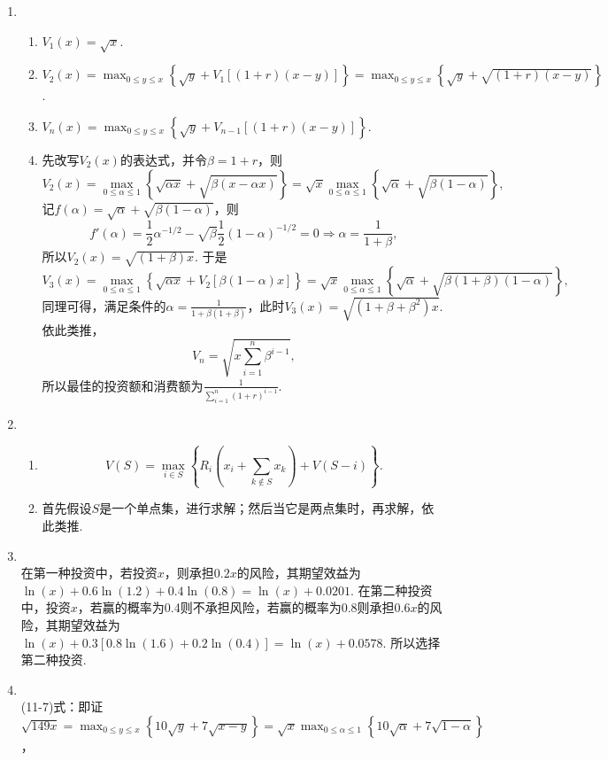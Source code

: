 \begin{enumerate}[label=\arabic{section}.\arabic*]
    \item \sol
    \begin{enumerate}[label=\alph*)]
        \item $V_1(x)=\sqrt{x}$.
        \item $\displaystyle V_2(x)=\max_{0 \leq y \leq x}\left\{\sqrt{y}+V_1[(1+r)(x-y)]\right\}=\max_{0 \leq y \leq x}\left\{\sqrt{y}+\sqrt{(1+r)(x-y)}\right\}$.
        \item $\displaystyle V_n(x)=\max_{0 \leq y \leq x}\left\{\sqrt{y}+V_{n-1}[(1+r)(x-y)]\right\}$.
        \item 先改写$V_2(x)$的表达式，并令$\beta = 1+r$，则
        \[V_2(x)=\max_{0 \leq \alpha \leq 1} \left\{\sqrt{\alpha x}+\sqrt{\beta(x-\alpha x)}\right\}=\sqrt{x} \max_{0 \leq \alpha \leq 1} \left\{\sqrt{\alpha}+\sqrt{\beta(1-\alpha)}\right\},\]
        记$\displaystyle f(\alpha)=\sqrt{\alpha}+\sqrt{\beta(1-\alpha)}$，则
        \[f'(\alpha)=\frac{1}{2}\alpha^{-1/2}-\sqrt{\beta}\frac{1}{2}(1-\alpha)^{-1/2}=0 \Rightarrow \alpha=\frac{1}{1+\beta},\]
        所以$\displaystyle V_2(x)=\sqrt{(1+\beta)x}$. 于是\[V_3(x)=\max_{0 \leq \alpha \leq 1} \left\{\sqrt{\alpha x}+V_2[\beta(1-\alpha)x]\right\}=\sqrt{x} \max_{0 \leq \alpha \leq 1} \left\{\sqrt{\alpha}+\sqrt{\beta(1+\beta)(1-\alpha)}\right\},\]
        同理可得，满足条件的$\displaystyle \alpha=\frac{1}{1+\beta(1+\beta)}$，此时$\displaystyle V_3(x)=\sqrt{(1+\beta+\beta^2)x}$. 依此类推，
        \[V_n=\sqrt{x\sum_{i=1}^{n} \beta^{i-1}},\]
        所以最佳的投资额和消费额为$\displaystyle \frac{1}{\sum\limits_{i=1}^{n} (1+r)^{i-1}}$.
    \end{enumerate}
    \item \sol
    \begin{enumerate}[label=\alph*)]
        \item \[V(S)=\max_{i \in S} \left\{R_i\left(x_i+\sum_{k \notin S}x_k\right)+V(S-i)\right\}.\]
        \item 首先假设$S$是一个单点集，进行求解；然后当它是两点集时，再求解，依此类推.
    \end{enumerate}
    \item \sol\\
    在第一种投资中，若投资$x$，则承担$0.2x$的风险，其期望效益为$\ln(x)+0.6\ln(1.2)+0.4\ln(0.8)=\ln(x)+0.0201$. 在第二种投资中，投资$x$，若赢的概率为0.4则不承担风险，若赢的概率为0.8则承担$0.6x$的风险，其期望效益为$\ln(x)+0.3[0.8\ln(1.6)+0.2\ln(0.4)]=\ln(x)+0.0578$. 所以选择第二种投资.
    \item \pro\\
    (11-7)式：即证$\sqrt{149x}=\displaystyle \max_{0 \leq y \leq x}\left\{10\sqrt{y}+7\sqrt{x-y}\right\}=\sqrt{x}\max_{0 \leq \alpha \leq 1}\left\{10\sqrt{\alpha}+7\sqrt{1-\alpha}\right\}$，\\

\end{enumerate}
